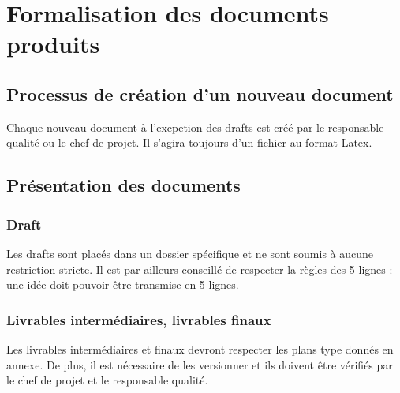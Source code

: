 \section{Formalisation des documents produits}
\subsection{Processus de création d'un nouveau document}
Chaque nouveau document à l'excpetion des drafts est créé par le responsable qualité ou le chef de projet. Il s'agira toujours d'un fichier au format Latex.
\subsection{Présentation des documents}
\subsubsection{Draft}
Les drafts sont placés dans un dossier spécifique et ne sont soumis à aucune restriction stricte. Il est par ailleurs conseillé de respecter la règles des 5 lignes : une idée doit pouvoir être transmise en 5 lignes.
\subsubsection{Livrables intermédiaires, livrables finaux}
Les livrables intermédiaires et finaux devront respecter les plans type donnés en annexe. De plus, il est nécessaire de les versionner et ils doivent être vérifiés par le chef de projet et le responsable qualité.
